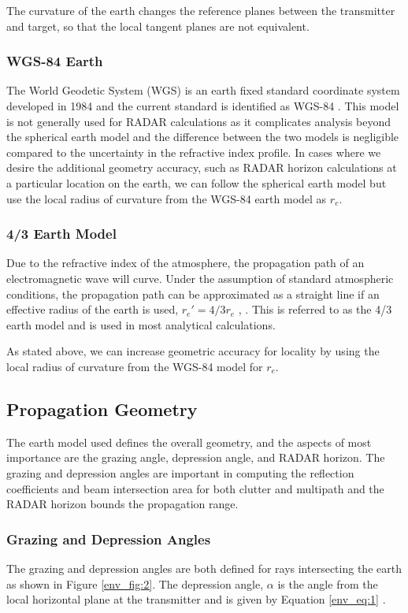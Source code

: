 The curvature of the earth changes the reference planes between the transmitter and target, so that the local tangent planes are not equivalent.

\subsubsection{WGS-84 Earth}
The World Geodetic System (WGS) is an earth fixed standard coordinate system developed in 1984 and the current standard is identified as WGS-84 \cite{dod_wgs84}. This model is not generally used for RADAR calculations as it complicates analysis beyond the spherical earth model and the difference between the two models is negligible compared to the uncertainty in the refractive index profile. In cases where we desire the additional geometry accuracy, such as RADAR horizon calculations at a particular location on the earth, we can follow the spherical earth model but use the local radius of curvature from the WGS-84 earth model as $r_e$.

\subsubsection{4/3 Earth Model}
Due to the refractive index of the atmosphere, the propagation path of an electromagnetic wave will curve. Under the assumption of standard atmospheric conditions, the propagation path can be approximated as a straight line if an effective radius of the earth is used, $r_e' = 4/3 r_e$ \cite{blake_radar}, \cite{nathanson_radar}. This is referred to as the 4/3 earth model and is used in most analytical calculations.

As stated above, we can increase geometric accuracy for locality by using the local radius of curvature from the WGS-84 model for $r_e$.

\subsection{Propagation Geometry}
The earth model used defines the overall geometry, and the aspects of most importance are the grazing angle, depression angle, and RADAR horizon. The grazing and depression angles are important in computing the reflection coefficients and beam intersection area for both clutter and multipath and the RADAR horizon bounds the propagation range.

\subsubsection{Grazing and Depression Angles}
The grazing and depression angles are both defined for rays intersecting the earth as shown in Figure \ref{env_fig:2}. The depression angle, $\alpha$ is the angle from the local horizontal plane at the transmitter and is given by Equation \ref{env_eq:1} \cite{nathanson_radar}.

